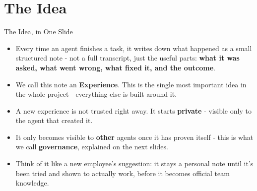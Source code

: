 \documentclass{beamer}
\begin{document}
\section{The Idea}
\begin{frame}{The Idea, in One Slide}
    \begin{itemize}
        \item Every time an agent finishes a task, it writes down what happened as a small structured note - not a full transcript, just the useful parts: \textbf{what it was asked, what went wrong, what fixed it, and the outcome}.
        \item We call this note an \textbf{Experience}. This is the single most important idea in the whole project - everything else is built around it.
        \item A new experience is not trusted right away. It starts \textbf{private} - visible only to the agent that created it.
        \item It only becomes visible to \textbf{other} agents once it has proven itself - this is what we call \textbf{governance}, explained on the next slides.
        \item Think of it like a new employee's suggestion: it stays a personal note until it's been tried and shown to actually work, before it becomes official team knowledge.
    \end{itemize}
\end{frame}

\end{document}
